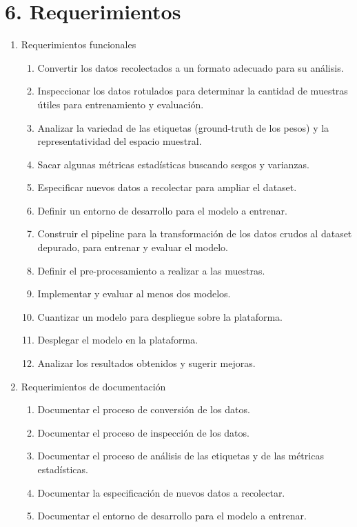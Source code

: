 \documentclass[
11pt, %
codirector, %
]{charter}
\begin{document}
\section{6. Requerimientos}
\label{sec:requerimientos}


\begin{enumerate}
	\item Requerimientos funcionales
		\begin{enumerate}
			\item Convertir los datos recolectados a un formato adecuado 					  para su análisis.
			\item Inspeccionar los datos rotulados para determinar la 						cantidad de muestras útiles para entrenamiento y 							evaluación.
			\item Analizar la variedad de las etiquetas (ground-truth de 					  los pesos) y la representatividad del espacio 								muestral.
			\item Sacar algunas métricas estadísticas buscando sesgos y 						varianzas.
			\item Especificar nuevos datos a recolectar para ampliar el 						dataset.
			\item Definir un entorno de desarrollo para el modelo a 							entrenar.
			\item Construir el pipeline para la transformación de los 							datos crudos al dataset depurado, para entrenar y 						evaluar el modelo.
			\item Definir el pre-procesamiento a realizar a las muestras.
			\item Implementar y evaluar al menos dos modelos.
			\item Cuantizar un modelo para despliegue sobre la plataforma.
			\item Desplegar el modelo en la plataforma.
			\item Analizar los resultados obtenidos y sugerir mejoras.
		\end{enumerate}
	\item Requerimientos de documentación
		\begin{enumerate}
			\item Documentar el proceso de conversión de los datos.
			\item Documentar el proceso de inspección de los datos.
			\item Documentar el proceso de análisis de las etiquetas y de 						las métricas estadísticas.
			\item Documentar la especificación de nuevos datos a recolectar.
			\item Documentar el entorno de desarrollo para el modelo a entrenar.

\end{enumerate}
\end{enumerate}
\end{document}
